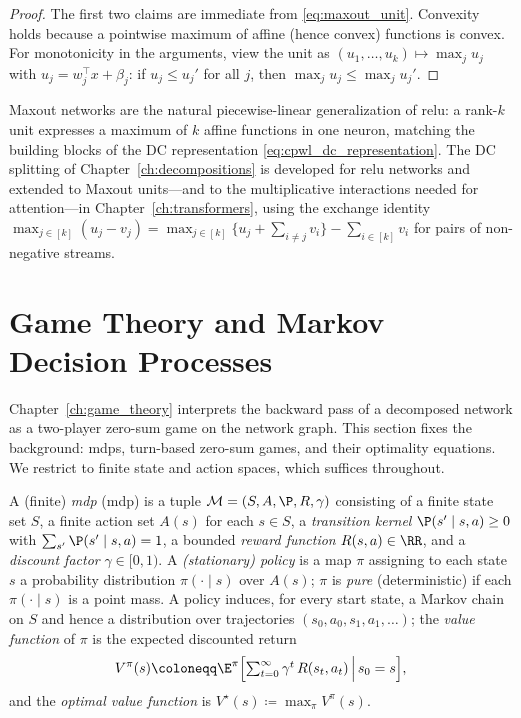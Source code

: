 \begin{proof}
The first two claims are immediate from \eqref{eq:maxout_unit}. Convexity holds because a pointwise maximum of affine (hence convex) functions is convex. For monotonicity in the arguments, view the unit as $(u_1, \ldots, u_k) \mapsto \max_j u_j$ with $u_j = w_j^\top x + \beta_j$: if $u_j \le u_j'$ for all $j$, then $\max_j u_j \le \max_j u_j'$.
\end{proof}

\begin{remark}\label{rem:maxout_role}
Maxout networks are the natural piecewise-linear generalization of \ac{relu}: a rank-$k$ unit expresses a maximum of $k$ affine functions in one neuron, matching the building blocks of the DC representation \eqref{eq:cpwl_dc_representation}. The DC splitting of Chapter~\ref{ch:decompositions} is developed for \ac{relu} networks and extended to Maxout units---and to the multiplicative interactions needed for attention---in Chapter~\ref{ch:transformers}, using the exchange identity $\max_{j \in [k]}(u_j - v_j) = \max_{j \in [k]}\bigl\{ u_j + \sum_{i \ne j} v_i \bigr\} - \sum_{i \in [k]} v_i$ for pairs of non-negative streams.
\end{remark}

\section{Game Theory and Markov Decision Processes}\label{sec:game_theory_mdp_foundations}

Chapter~\ref{ch:game_theory} interprets the backward pass of a decomposed network as a two-player zero-sum game on the network graph. This section fixes the background: \acp{mdp}, turn-based zero-sum games, and their optimality equations. We restrict to finite state and action spaces, which suffices throughout.

\begin{definition}\label{def:mdp}
A (finite) \emph{\acl{mdp}} (\acs{mdp}) \cite{Puterman1994mdp,SuttonBarto2018rl} is a tuple $\mathcal{M} = (S, A, \P, R, \gamma)$ consisting of a finite state set $S$, a finite action set $A(s)$ for each $s \in S$, a \emph{transition kernel} $\P(s' \mid s, a) \ge 0$ with $\sum_{s'} \P(s' \mid s, a) = 1$, a bounded \emph{reward function} $R(s, a) \in \RR$, and a \emph{discount factor} $\gamma \in [0, 1)$. A \emph{(stationary) policy} is a map $\pi$ assigning to each state $s$ a probability distribution $\pi(\cdot \mid s)$ over $A(s)$; $\pi$ is \emph{pure} (deterministic) if each $\pi(\cdot \mid s)$ is a point mass. A policy induces, for every start state, a Markov chain on $S$ and hence a distribution over trajectories $(s_0, a_0, s_1, a_1, \ldots)$; the \emph{value function} of $\pi$ is the expected discounted return
\begin{equation}
	V^{\pi}(s) \coloneqq \E^{\pi}\Bigl[ \textstyle\sum_{t=0}^{\infty} \gamma^{t}\, R(s_t, a_t) \,\Big|\, s_0 = s \Bigr],
	\label{eq:mdp_value}
\end{equation}
and the \emph{optimal value function} is $V^{\star}(s) \coloneqq \max_{\pi} V^{\pi}(s)$.
\end{definition}

